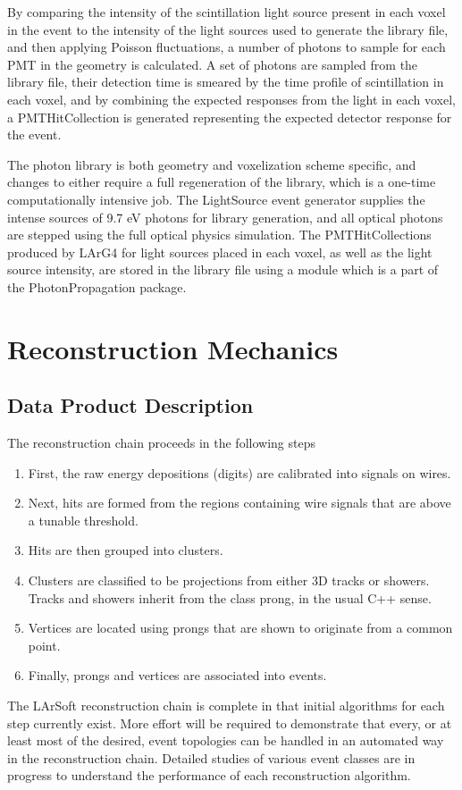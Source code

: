 \documentclass[12pt]{elsarticle}
\begin{document}
By comparing the intensity of the scintillation light source present in each voxel in the event to the intensity of the light sources used to generate the library file, and then applying Poisson fluctuations, a number of photons to sample for each PMT in the geometry is calculated.  A set of photons are sampled from the library file, their detection time is smeared by the time profile of scintillation in each voxel, and by combining the expected responses from the light in each voxel, a PMTHitCollection is generated representing the expected detector response for the event.

The photon library is both geometry and voxelization scheme specific, and changes to either require a full regeneration of the library, which is a one-time computationally intensive job.  The LightSource event generator supplies the intense sources of 9.7 eV photons for library generation, and all optical photons are stepped using the full optical physics simulation. The PMTHitCollections produced by LArG4 for light sources placed in each voxel, as well as the light source intensity, are stored in the library file using a module which is a part of the PhotonPropagation package.  

\section{Reconstruction Mechanics}
\subsection{Data Product Description}
The reconstruction chain proceeds in the following steps
\begin{enumerate}
\item First, the raw energy depositions (digits) are calibrated into signals on wires.
\item Next, hits are formed from the regions containing wire signals that are above a tunable threshold.
\item Hits are then grouped into clusters.
\item Clusters are classified to be projections from either 3D tracks or showers. Tracks and showers inherit from the class prong, in the usual C++ sense.
\item Vertices are located using prongs that are shown to originate from a common point.
\item Finally, prongs and vertices are associated into events.
\end{enumerate}
The LArSoft reconstruction chain is complete in that initial algorithms for each step currently exist.  More effort will be required to demonstrate that every, or at least most of the desired, event topologies can be handled in an automated way in the reconstruction chain. Detailed studies of various event classes are in progress to understand the performance of each reconstruction algorithm.
\end{document}
